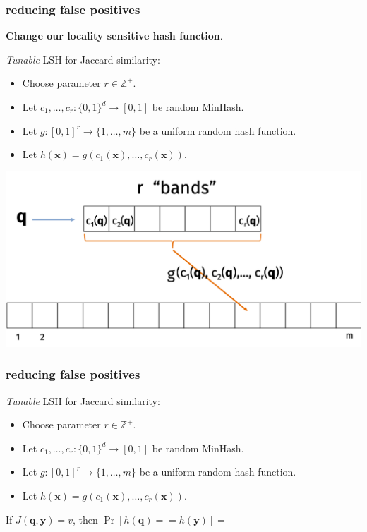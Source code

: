 \documentclass[compress]{beamer}
\newcommand{\bv}[1]{\mathbf{#1}}
\begin{document}
\begin{frame}[t]
	\frametitle{reducing false positives}
	\small
	\vspace{-.5em}
	\begin{center}
	\textbf{Change our locality sensitive hash function}.
	\vspace{-.5em}
	\end{center}
	\emph{Tunable} LSH for Jaccard similarity:
	\vspace{-.5em}
	\begin{itemize}
		\item Choose parameter $r \in \mathbb{Z}^+$.
		\item Let $c_1, \ldots, c_r: \{0,1\}^d \rightarrow [0,1]$ be random MinHash.
		\item Let $g: [0,1]^r \rightarrow \{1, \ldots, m\}$ be a uniform random hash function.
		\item Let $h(\bv{x}) = g(c_1(\bv{x}), \ldots, c_r(\bv{x})).$
	\end{itemize}
\vspace{-1em}
	\begin{center}
			\includegraphics[width=.8\textwidth]{banded_hash.png}
	\end{center}


\end{frame}

\begin{frame}[t]
	\frametitle{reducing false positives}
	\small
	\emph{Tunable} LSH for Jaccard similarity:
	\begin{itemize}
		\item Choose parameter $r \in \mathbb{Z}^+$.
		\item Let $c_1, \ldots, c_r: \{0,1\}^d \rightarrow [0,1]$ be random MinHash.
		\item Let $g: [0,1]^r \rightarrow \{1, \ldots, m\}$ be a uniform random hash function.
		\item Let $h(\bv{x}) = g(c_1(\bv{x}), \ldots, c_r(\bv{x})).$
	\end{itemize}
	
	If $J(\bv{q},\bv{y}) = v$, then $\Pr\left[h(\bv{q}) == h(\bv{y})\right] = $
	
\end{frame}
\end{document}
